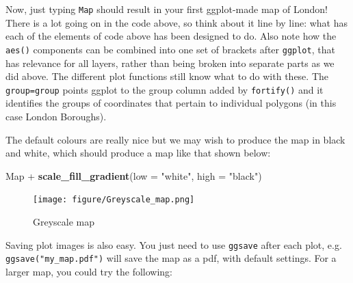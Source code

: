 \documentclass[]{article}
\newenvironment{Shaded}{}{}
\newcommand{\KeywordTok}[1]{\textcolor[rgb]{0.00,0.44,0.13}{\textbf{{#1}}}}
\newcommand{\DataTypeTok}[1]{\textcolor[rgb]{0.56,0.13,0.00}{{#1}}}
\newcommand{\StringTok}[1]{\textcolor[rgb]{0.25,0.44,0.63}{{#1}}}
\newcommand{\NormalTok}[1]{{#1}}
\begin{document}
\begin{Shaded}
\end{Shaded}
Now, just typing \texttt{Map} should result in your first ggplot-made
map of London! There is a lot going on in the code above, so think about
it line by line: what has each of the elements of code above has been
designed to do. Also note how the \texttt{aes()} components can be
combined into one set of brackets after \texttt{ggplot}, that has
relevance for all layers, rather than being broken into separate parts
as we did above. The different plot functions still know what to do with
these. The \texttt{group=group} points ggplot to the group column added
by \texttt{fortify()} and it identifies the groups of coordinates that
pertain to individual polygons (in this case London Boroughs).

The default colours are really nice but we may wish to produce the map
in black and white, which should produce a map like that shown below:

\begin{Shaded}
\begin{Highlighting}[]
\NormalTok{Map + }\KeywordTok{scale_fill_gradient}\NormalTok{(}\DataTypeTok{low =} \StringTok{"white"}\NormalTok{, }\DataTypeTok{high =} \StringTok{"black"}\NormalTok{)}
\end{Highlighting}
\end{Shaded}
\begin{figure}[htbp]
\centering
\texttt{[image: figure/Greyscale\_map.png]}
\caption{Greyscale map}
\end{figure}

Saving plot images is also easy. You just need to use \texttt{ggsave}
after each plot, e.g. \texttt{ggsave("my\_map.pdf")} will save the map
as a pdf, with default settings. For a larger map, you could try the
following:
\end{document}
